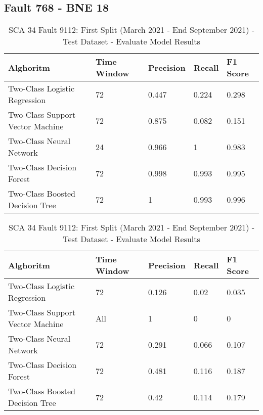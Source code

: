 \subsection{Fault 768 - BNE 18}

\begin{table}[!ht]
    \centering
    \begin{tabular}{|l|l|l|l|l|}
    \hline
        Alghoritm & Time Window & Precision & Recall & F1 Score \\ \hline
        Two-Class Logistic Regression & 72 & 0.447 & 0.224 & 0.298 \\ \hline
        Two-Class Support Vector Machine & 72 & 0.875 & 0.082 & 0.151 \\ \hline
        Two-Class Neural Network & 24 & 0.966 & 1 & 0.983 \\ \hline
        Two-Class Decision Forest & 72 & 0.998 & 0.993 & 0.995 \\ \hline
        Two-Class Boosted Decision Tree & 72 & 1 & 0.993 & 0.996 \\ \hline
    \end{tabular}
    \caption{SCA 34 Fault 9112: First Split (March 2021 - End September 2021) - Test Dataset - Evaluate Model Results}
    \label{9112_SCA34_1st}
\end{table}

\begin{table}[!ht]
    \centering
    \begin{tabular}{|l|l|l|l|l|}
    \hline
        Alghoritm & Time Window & Precision & Recall & F1 Score \\ \hline
        Two-Class Logistic Regression & 72 & 0.126 & 0.02 & 0.035 \\ \hline
        Two-Class Support Vector Machine & All & 1 & 0 & 0 \\ \hline
        Two-Class Neural Network & 72 & 0.291 & 0.066 & 0.107 \\ \hline
        Two-Class Decision Forest & 72 & 0.481 & 0.116 & 0.187 \\ \hline
        Two-Class Boosted Decision Tree & 72 & 0.42 & 0.114 & 0.179 \\ \hline
    \end{tabular}
    \caption{SCA 34 Fault 9112: First Split (March 2021 - End September 2021) - Test Dataset - Evaluate Model Results}
    \label{9112_SCA34_1st}
\end{table}

